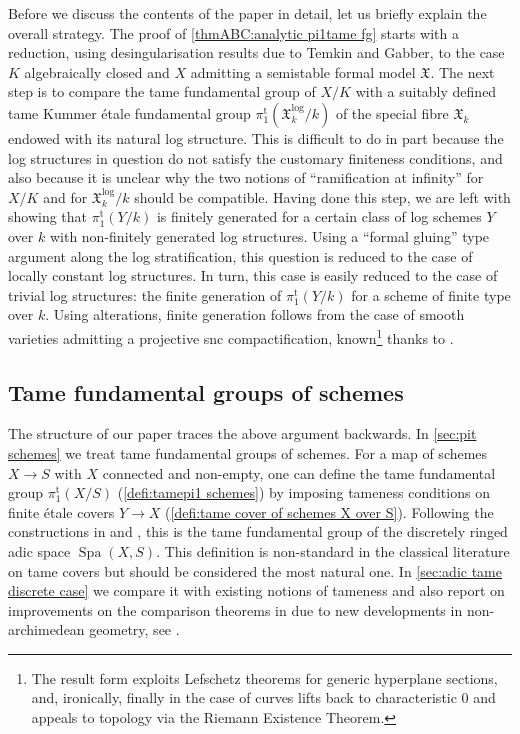 \documentclass[a4paper,twoside,11pt,reqno]{amsart}
\DeclareRobustCommand{\SkipTocEntry}[5]{}
\newcommand{\fX}{{\mathfrak{X}}}
\DeclareMathOperator{\Spa}{Spa}
\newcommand{\pitame}{\pi_1^{\mathrm{t}}}
\theoremstyle{definition}
\numberwithin{equation}{subsection}
\begin{document}
Before we discuss the contents of the paper in detail, let us briefly explain the overall strategy. The proof of \cref{thmABC:analytic pi1tame fg} starts with a reduction, using desingularisation results due to Temkin and Gabber, to the case $K$ algebraically closed and $X$ admitting a semistable formal model $\fX$. The next step is to compare the tame fundamental group of $X/K$ with a suitably defined tame Kummer \'etale fundamental group $\pitame(\fX^{\log}_k/k)$ of the special fibre $\fX_k$ endowed with its natural log structure. This is difficult to do in part because the log structures in question do not satisfy the customary finiteness conditions, and also because it is unclear why the two notions of ``ramification at infinity'' for $X/K$ and for $\fX^{\log}_k/k$ should be compatible. Having done this step, we are left with showing that $\pitame(Y/k)$ is finitely generated for a certain class of log schemes $Y$ over $k$ with non-finitely generated log structures. Using a ``formal gluing'' type argument along the log stratification, this question is reduced to the case of locally constant log structures. In turn, this case is easily reduced to the case of trivial log structures: the finite generation of $\pitame(Y/k)$ for a scheme of finite type over $k$. Using alterations, finite generation follows from the case of smooth varieties admitting a projective snc compactification, known\footnote{The result form \cite{EsnaultKindler2016:LefschetzTheoremsTamely} exploits Lefschetz theorems for generic hyperplane sections, and, ironically, finally in the case of curves lifts back to characteristic $0$ and appeals to topology via the Riemann Existence Theorem.} thanks to \cite{EsnaultKindler2016:LefschetzTheoremsTamely}. 


\subsection*{Tame fundamental groups of schemes}

The structure of our paper traces the above argument backwards. In \cref{sec:pit schemes} we treat tame fundamental groups of schemes. For a map of schemes $X\to S$ with $X$ connected and non-empty, one can define the tame fundamental group $\pitame(X/S)$ (\cref{defi:tamepi1 schemes}) by imposing tameness conditions on finite \'etale covers $Y\to X$ (\cref{defi:tame cover of schemes X over S}). Following the constructions in \cite{Temkin2011:RelativeRiemannZariskiSpacesa} and \cite{Hubner2021:AdicTameSite}, this is the tame fundamental group of the discretely ringed adic space $\Spa(X,S)$.
This definition is non-standard in the classical literature on tame covers but should be considered the most natural one.
In \cref{sec:adic tame discrete case} we compare it with existing notions of tameness and also report on improvements on the comparison theorems in \cite{KerzSchmidt2010:DifferentNotionsTameness} due to new developments in non-archimedean geometry, see \cite{HuebnerTemkin2026:WildLocus}.
\end{document}
